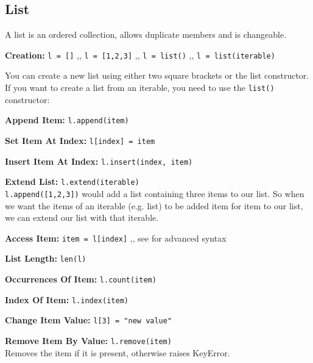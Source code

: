 \subsection{List} \label{List}
    A list is an ordered collection, allows duplicate members and is changeable.

    \begin{indentblock}

        \textbf{Creation:} \texttt{l = []} \sep{,} \texttt{l = [1,2,3]}
        \sep{,} \texttt{l = list()} \sep{,} \texttt{l = list(iterable)}

        You can create a new list using either two square brackets or the list constructor.
        If you want to create a list from an iterable, you need to use the
        \texttt{list()} constructor:


        \textbf{Append Item:} \texttt{l.append(item)}

        \textbf{Set Item At Index:} \texttt{l[index] = item}

        \textbf{Insert Item At Index:} \texttt{l.insert(index, item)}

        \textbf{Extend List:} \texttt{l.extend(iterable)} \\
        \texttt{l.append([1,2,3])} would add a list containing three items to our list.
        So when we want the items of an iterable (e.g. list) to be added item for item to our list,
        we can extend our list with that iterable.


        \textbf{Access Item:} \texttt{item = l[index]} \sep{,}
        see  for advanced syntax

        \textbf{List Length:} \texttt{len(l)}

        \textbf{Occurrences Of Item:} \texttt{l.count(item)}

        \textbf{Index Of Item:} \texttt{l.index(item)}

        \textbf{Change Item Value:} \texttt{l[3] = "new value"}

        \textbf{Remove Item By Value:} \texttt{l.remove(item)} \\
        Removes the item if it is present, otherwise raises KeyError.


\end{indentblock}
